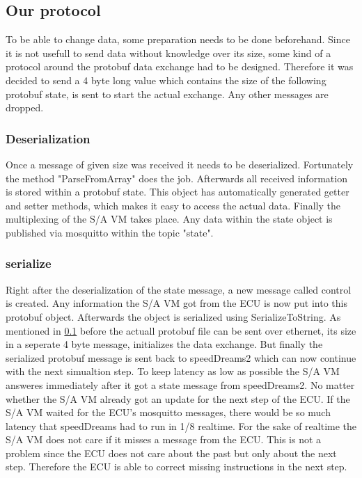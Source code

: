 \documentclass[paper=a4, fontsize=11pt]{scrartcl}
\begin{document}
  \subsection{Our protocol} \label{ourprotocol}
To be able to change data, some preparation needs to be done beforehand. Since it is not usefull to send data without knowledge over its size, some kind of a protocol around the protobuf data exchange had to be designed. Therefore it was decided to send a 4 byte long value which contains the size of the following protobuf state, is sent to start the actual exchange. Any other messages are dropped.
  \subsubsection{Deserialization}
Once a message of given size was received it needs to be deserialized. Fortunately the method "ParseFromArray" does the job. Afterwards all received information is stored within a protobuf state. This object has automatically generated getter and setter methods, which makes it easy to access the actual data. Finally the multiplexing of the S/A VM takes place. Any data within the state object is published via mosquitto within the topic "state".
  \subsubsection{serialize}
Right after the deserialization of the state message, a new message called control is created. Any information the S/A VM got from the ECU is now put into this protobuf object. Afterwards the object is serialized using SerializeToString. As mentioned in \ref{ourprotocol} before the actuall protobuf file can be sent over ethernet, its size in a seperate 4 byte message, initializes the data exchange. But finally the serialized protobuf message is sent back to speedDreams2 which can now continue with the next simualtion step.\newline
To keep latency as low as possible the S/A VM answeres immediately after it got a state message from speedDreams2. No matter whether the S/A VM already got an update for the next step of the ECU. If the S/A VM waited for the ECU's mosquitto messages, there would be so much latency that speedDreams had to run in 1/8 realtime. For the sake of realtime the S/A VM does not care if it misses a message from the ECU. This is not a problem since the ECU does not care about the past but only about the next step. Therefore the ECU is able to correct missing instructions in the next step.
\end{document}
